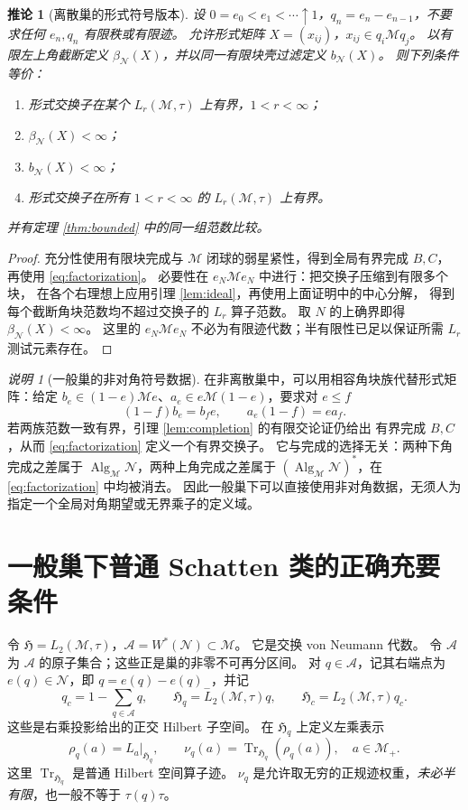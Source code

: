 \documentclass[UTF8,11pt,a4paper,fontset=fandol]{ctexart}
\newtheorem{corollary}[theorem]{推论}
\theoremstyle{remark}
\newtheorem{remark}[theorem]{说明}
\numberwithin{equation}{section}
\newcommand{\M}{\mathcal M}
\newcommand{\N}{\mathcal N}
\newcommand{\Alg}{\operatorname{Alg}_{\M}\N}
\newcommand{\HH}{\mathfrak H}
\newcommand{\Tr}{\operatorname{Tr}}
\begin{document}
\begin{corollary}[离散巢的形式符号版本]\label{cor:formal}
设 $0=e_0<e_1<\cdots\uparrow1$，$q_n=e_n-e_{n-1}$，不要求任何
$e_n,q_n$ 有限秩或有限迹。
允许形式矩阵 $X=(x_{ij})$，$x_{ij}\in q_i\M q_j$。
以有限左上角截断定义 $\beta_\N(X)$，并以同一有限块壳过滤定义 $b_\N(X)$。
则下列条件等价：
\begin{enumerate}[label=\textup{(\roman*)}]
 \item 形式交换子在某个 $L_r(\M,\tau)$ 上有界，$1<r<\infty$；
 \item $\beta_\N(X)<\infty$；
 \item $b_\N(X)<\infty$；
 \item 形式交换子在所有 $1<r<\infty$ 的 $L_r(\M,\tau)$ 上有界。
\end{enumerate}
并有定理 \ref{thm:bounded} 中的同一组范数比较。
\end{corollary}

\begin{proof}
充分性使用有限块完成与 $\M$ 闭球的弱星紧性，得到全局有界完成 $B,C$，
再使用 \eqref{eq:factorization}。
必要性在 $e_N\M e_N$ 中进行：把交换子压缩到有限多个块，
在各个右理想上应用引理 \ref{lem:ideal}，再使用上面证明中的中心分解，
得到每个截断角块范数均不超过交换子的 $L_r$ 算子范数。
取 $N$ 的上确界即得 $\beta_\N(X)<\infty$。
这里的 $e_N\M e_N$ 不必为有限迹代数；半有限性已足以保证所需 $L_r$ 测试元素存在。
\end{proof}

\begin{remark}[一般巢的非对角符号数据]
在非离散巢中，可以用相容角块族代替形式矩阵：给定
$b_e\in(1-e)\M e$、$a_e\in e\M(1-e)$，要求对 $e\leq f$
\[
 (1-f)b_e=b_f e,\qquad a_e(1-f)=e a_f.
\]
若两族范数一致有界，引理 \ref{lem:completion} 的有限交论证仍给出
有界完成 $B,C$，从而 \eqref{eq:factorization} 定义一个有界交换子。
它与完成的选择无关：两种下角完成之差属于 $\Alg$，两种上角完成之差属于
$(\Alg)^*$，在 \eqref{eq:factorization} 中均被消去。
因此一般巢下可以直接使用非对角数据，无须人为指定一个全局对角期望或无界乘子的定义域。
\end{remark}

\section{一般巢下普通 Schatten 类的正确充要条件}

令 $\HH=L_2(\M,\tau)$，$\mathcal A=W^*(\N)\subset\M$。
它是交换 von Neumann 代数。
令 $\mathscr A$ 为 $\mathcal A$ 的原子集合；这些正是巢的非零不可再分区间。
对 $q\in\mathscr A$，记其右端点为 $e(q)\in\N$，即
$q=e(q)-e(q)_-$，并记
\[
 q_c=1-\sum_{q\in\mathscr A}q,\qquad
 \HH_q=L_2(\M,\tau)q,\qquad \HH_c=L_2(\M,\tau)q_c.
\]
这些是右乘投影给出的正交 Hilbert 子空间。
在 $\HH_q$ 上定义左乘表示
\[
 \rho_q(a)=L_a|_{\HH_q},\qquad
 \nu_q(a)=\Tr_{\HH_q}(\rho_q(a)),\quad a\in\M_+.
\]
这里 $\Tr_{\HH_q}$ 是普通 Hilbert 空间算子迹。
$\nu_q$ 是允许取无穷的正规迹权重，\emph{未必半有限}，也一般不等于 $\tau(q)\tau$。
\end{document}
